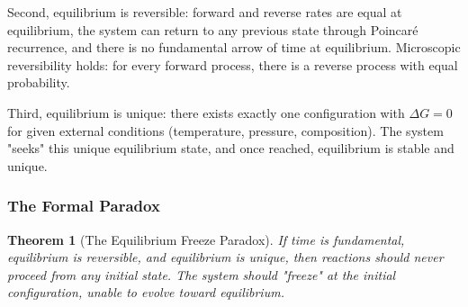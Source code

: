\documentclass[12pt,a4paper]{article}
\newtheorem{theorem}{Theorem}[section]
\theoremstyle{definition}
\theoremstyle{remark}
\begin{document}
Second, equilibrium is reversible: forward and reverse rates are equal at equilibrium, the system can return to any previous state through Poincaré recurrence, and there is no fundamental arrow of time at equilibrium. Microscopic reversibility holds: for every forward process, there is a reverse process with equal probability.

Third, equilibrium is unique: there exists exactly one configuration with $\Delta G = 0$ for given external conditions (temperature, pressure, composition). The system "seeks" this unique equilibrium state, and once reached, equilibrium is stable and unique.

\subsubsection{The Formal Paradox}

\begin{theorem}[The Equilibrium Freeze Paradox]
\label{thm:freeze_paradox}
If time is fundamental, equilibrium is reversible, and equilibrium is unique, then reactions should never proceed from any initial state. The system should "freeze" at the initial configuration, unable to evolve toward equilibrium.
\end{theorem}
\end{document}

